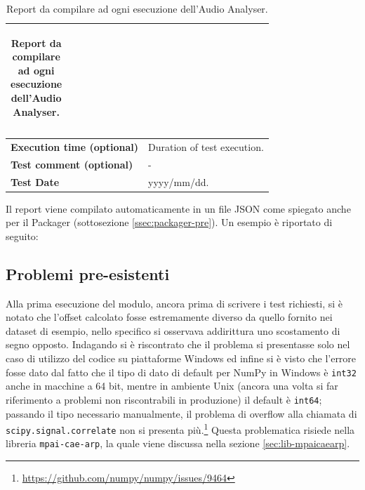 \begin{spacing}{1.1}
\begin{table}[H]
\begin{tabularx}{\textwidth}{|p{}|X|}
\begin{adjustbox}{max width=0.65\textwidth}
\begin{tabular}{|c|c|c|}
                \hline
            \end{tabular} \end{adjustbox} \smallskip\\
            \hline
            \textbf{Execution time (optional)}                  &   Duration of test execution.\\
            \hline
            \textbf{Test comment (optional)}                    &   -\\
            \hline
            \textbf{Test Date}                                  &   yyyy/mm/dd.\\
            \hline
        \end{tabularx}
    \caption{Report da compilare ad ogni esecuzione dell'Audio Analyser.}
    \label{tab:audioanalyser-report}
\end{table}
\end{spacing}
Il report viene compilato automaticamente in un file JSON come spiegato anche per il Packager (sottosezione \ref{ssec:packager-pre}).
Un esempio è riportato di seguito:



\subsection{Problemi pre-esistenti} \label{ssec:audioanalyser-pre}  %
Alla prima esecuzione del modulo, ancora prima di scrivere i test richiesti, si è notato che l'offset calcolato fosse estremamente diverso da quello fornito nei dataset di esempio, nello specifico si osservava addirittura uno scostamento di segno opposto. Indagando si è riscontrato che il problema si presentasse solo nel caso di utilizzo del codice su piattaforme Windows ed infine si è visto che l'errore fosse dato dal fatto che il tipo di dato di default per NumPy in Windows è \texttt{int32} anche in macchine a 64 bit, mentre in ambiente Unix (ancora una volta si far riferimento a problemi non riscontrabili in produzione) il default è \texttt{int64}; passando il tipo necessario manualmente, il problema di overflow alla chiamata di \texttt{scipy.signal.correlate} non si presenta più.\footnote{\url{https://github.com/numpy/numpy/issues/9464}}
Questa problematica risiede nella libreria \texttt{mpai-cae-arp}, la quale viene discussa nella sezione \ref{sec:lib-mpaicaearp}.   %

